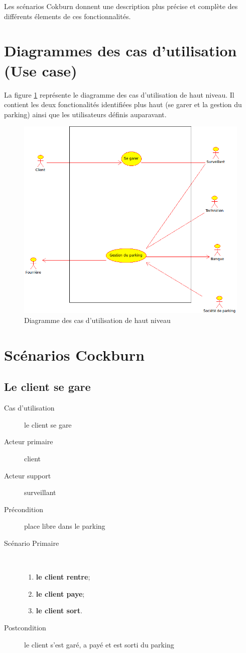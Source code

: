 \documentclass[a4paper]{article}
\begin{document}
Les sc\'enarios Cokburn donnent une description plus pr\'ecise et compl\`ete des diff\'erents
\'elements de ces fonctionnalit\'es.

\section{Diagrammes des cas d'utilisation (Use case)}
La figure \ref{usecase} repr\'esente le diagramme des cas d'utilisation
de haut niveau. Il contient les deux fonctionalit\'es identifi\'ees plus
haut (se garer et la gestion du parking) ainsi que les utilisateurs
d\'efinis auparavant.
\begin{figure}[!ht]
	\centering
	\includegraphics[scale=.7]{parking.png}
	\caption{\label{usecase} Diagramme des cas d'utilisation de haut niveau}
\end{figure}
\newpage

\section{Sc\'enarios Cockburn}
\subsection{Le client se gare}
\begin{description}
	\item[Cas d'utilisation] le client se gare
	\item[Acteur primaire] client
	\item[Acteur support] surveillant
	\item[Pr\'econdition] place libre dans le parking
	\item[Sc\'enario Primaire] \
	\begin{enumerate}
		\item \textbf{le client rentre};
		\item \textbf{le client paye};
		\item \textbf{le client sort}.
	\end{enumerate}
	\item[Postcondition] le client s'est gar\'e, a pay\'e et est sorti du parking
\end{description}
\end{document}
